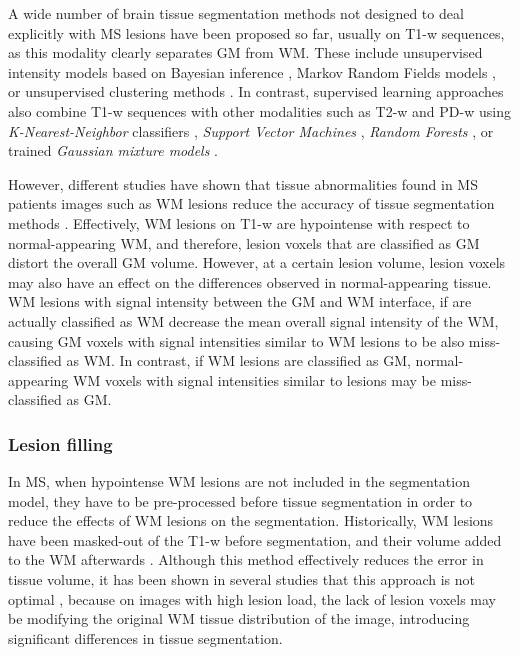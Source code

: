 A wide number of brain tissue segmentation methods not designed to deal explicitly with MS lesions have been proposed so far, usually on T1-w sequences, as this modality clearly separates GM from WM. These include unsupervised intensity models based on Bayesian inference \cite{Ashburner2005,Pohl2006,Roy2012,VanLeemput2003,Wells1996}, Markov Random Fields models \cite{Bricq2008, Tohka2010, Zhang2001}, or unsupervised clustering methods \cite{Caldairou2011, Pham2001}. In contrast, supervised learning approaches also combine T1-w sequences with other modalities such as T2-w and PD-w using \textit{K-Nearest-Neighbor} classifiers \cite{deBoer2009,Vrooman2013}, \textit{Support Vector Machines} \cite{Akselrod2006,Opbroek2013}, \textit{Random Forests} \cite{yi2009,Mahapatra2014}, or trained \textit{Gaussian mixture models} \cite{Rajchl2015}. 

However, different studies have shown that tissue abnormalities found in MS patients images such as WM lesions reduce the accuracy of tissue segmentation methods \cite{Battaglini2012, Chard2010}. Effectively, WM lesions on T1-w are hypointense with respect to normal-appearing WM, and  therefore, lesion voxels that are classified as GM distort the overall GM volume. However, at a certain lesion volume, lesion voxels may also have an effect on the differences observed in normal-appearing tissue. WM lesions with signal intensity between the GM and WM interface, if are actually classified as WM decrease the mean overall signal intensity of the WM, causing GM voxels with signal intensities similar to WM lesions to be also miss-classified as WM.  In contrast, if WM lesions are classified as GM, normal-appearing WM voxels with signal intensities similar to lesions may be miss-classified as GM. 
 
\subsubsection{Lesion filling}
\label{subsec:lesion_filling}
In MS, when hypointense WM lesions are not included in the segmentation model, they have to be pre-processed before tissue segmentation in order to reduce the effects of WM lesions on the segmentation. Historically, WM lesions have been masked-out of the T1-w before segmentation, and their volume added to the WM afterwards \cite{Chard2002}. Although this method effectively reduces the error in tissue volume, it has been shown in several studies that this approach is not optimal \cite{Battaglini2012, Chard2010}, because on images with high lesion load, the lack of lesion voxels may be modifying the original WM tissue distribution of the image, introducing significant differences in tissue segmentation. 

